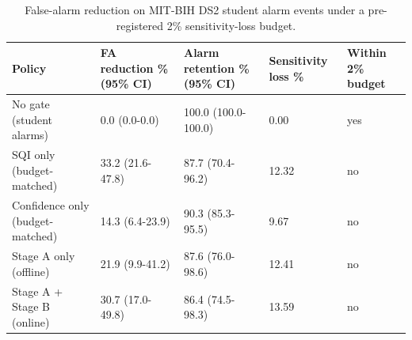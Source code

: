 \begin{table}[t]
\centering
\caption{False-alarm reduction on MIT-BIH DS2 student alarm events under a pre-registered 2\% sensitivity-loss budget.}
\label{tab:gate}
\begin{tabular}{lllll}
\toprule
Policy & FA reduction \% (95\% CI) & Alarm retention \% (95\% CI) & Sensitivity loss \% & Within 2\% budget \\
\midrule
No gate (student alarms) & 0.0 (0.0-0.0) & 100.0 (100.0-100.0) & 0.00 & yes \\
SQI only (budget-matched) & 33.2 (21.6-47.8) & 87.7 (70.4-96.2) & 12.32 & no \\
Confidence only (budget-matched) & 14.3 (6.4-23.9) & 90.3 (85.3-95.5) & 9.67 & no \\
Stage A only (offline) & 21.9 (9.9-41.2) & 87.6 (76.0-98.6) & 12.41 & no \\
Stage A + Stage B (online) & 30.7 (17.0-49.8) & 86.4 (74.5-98.3) & 13.59 & no \\
\bottomrule
\end{tabular}
\end{table}
